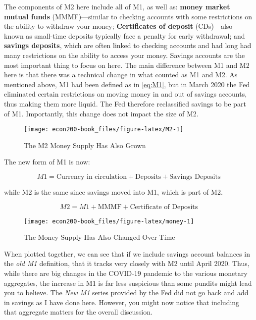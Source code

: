 \documentclass[
]{book}
\begin{document}
The components of M2 here include all of M1, as well as: \textbf{money market mutual funds} (MMMF)---similar to checking accounts with some restrictions on the ability to withdraw your money; \textbf{Certificates of deposit} (CDs)---also known as small-time deposits typically face a penalty for early withdrawal; and \textbf{savings deposits}, which are often linked to checking accounts and had long had many restrictions on the ability to access your money. Savings accounts are the most important thing to focus on here. The main difference between M1 and M2 here is that there was a technical change in what counted as M1 and M2. As mentioned above, M1 had been defined as in \eqref{eq:M1}, but in March 2020 the Fed eliminated certain restrictions on moving money in and out of savings accounts, thus making them more liquid. The Fed therefore reclassified savings to be part of M1. Importantly, this change does not impact the size of M2.

\begin{figure}

{\centering \texttt{[image: econ200-book\_files/figure-latex/M2-1]} 

}

\caption{The M2 Money Supply Has Also Grown}\label{fig:M2}
\end{figure}

The new form of M1 is now:

\begin{equation}
M1 = \text{Currency in circulation} + \text{Deposits} + \text{Savings Deposits} \label{eq:M1b}
\end{equation}

while M2 is the same since savings moved into M1, which is part of M2.

\begin{equation}
M2 = M1 + \text{MMMF} + \text{Certificate of Deposits} \label{eq:M22}
\end{equation}

\begin{figure}

{\centering \texttt{[image: econ200-book\_files/figure-latex/money-1]} 

}

\caption{The Money Supply Has Also Changed Over Time}\label{fig:money}
\end{figure}

When plotted together, we can see that if we include savings account balances in the \emph{old M1} definition, that it tracks very closely with M2 until April 2020. Thus, while there are big changes in the COVID-19 pandemic to the various monetary aggregates, the increase in M1 is far less suspicious than some pundits might lead you to believe. The \emph{New M1} series provided by the Fed did not go back and add in savings as I have done here. However, you might now notice that including that aggregate matters for the overall discussion.
\end{document}
